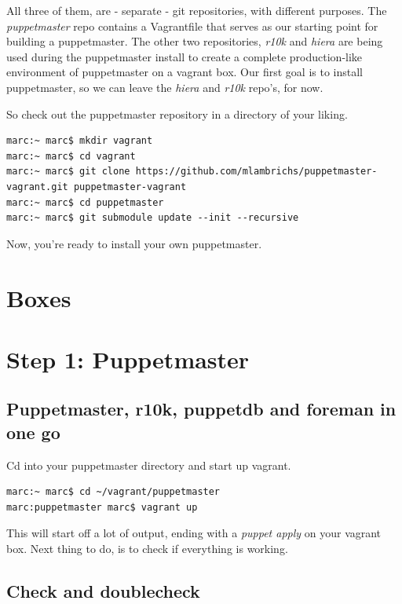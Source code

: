 \documentclass{article}
\begin{document}
\par All three of them, are - separate - git repositories, with different purposes. The \emph{puppetmaster} repo contains a Vagrantfile that serves as our starting point for building a puppetmaster. The other two repositories, \emph{r10k} and \emph{hiera} are being used during the puppetmaster install to create a complete production-like environment of puppetmaster on a vagrant box. Our first goal is to install puppetmaster, so we can leave the \emph{hiera} and \emph{r10k} repo's, for now.

\par So check out the puppetmaster repository in a directory of your liking.

\begin{verbatim}
marc:~ marc$ mkdir vagrant
marc:~ marc$ cd vagrant
marc:~ marc$ git clone https://github.com/mlambrichs/puppetmaster-vagrant.git puppetmaster-vagrant
marc:~ marc$ cd puppetmaster
marc:~ marc$ git submodule update --init --recursive
\end{verbatim}

\par Now, you're ready to install your own puppetmaster.

\section{Boxes}

\section{Step 1: Puppetmaster}

\subsection{Puppetmaster, r10k, puppetdb and foreman in one go}
Cd into your puppetmaster directory and start up vagrant.

\begin{verbatim}
marc:~ marc$ cd ~/vagrant/puppetmaster
marc:puppetmaster marc$ vagrant up
\end{verbatim}

This will start off a lot of output, ending with a \emph{puppet apply} on your vagrant box. Next thing to do, is to check if everything is working.

\subsection{Check and doublecheck}
\end{document}
